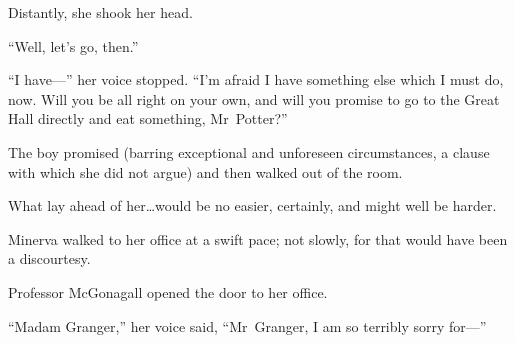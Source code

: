 Distantly, she shook her head.

“Well, let’s go, then.”

“I have—” her voice stopped. “I’m afraid I have something else which I must do, now. Will you be all right on your own, and will you promise to go to the Great Hall directly and eat something, Mr~Potter?”

The boy promised (barring exceptional and unforeseen circumstances, a clause with which she did not argue) and then walked out of the room.

What lay ahead of her…would be no easier, certainly, and might well be harder.

\later

Minerva walked to her office at a swift pace; not slowly, for that would have been a discourtesy.

Professor McGonagall opened the door to her office.

“Madam Granger,” her voice said, “Mr~Granger, I am so terribly sorry for—”

